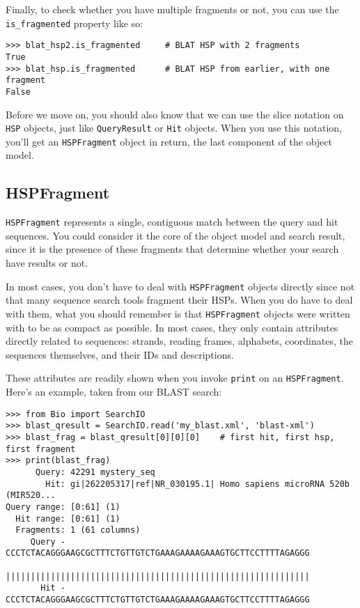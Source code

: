 \documentclass{report}
\begin{document}
Finally, to check whether you have multiple fragments or not, you can use the
\verb|is_fragmented| property like so:

\begin{verbatim}
>>> blat_hsp2.is_fragmented     # BLAT HSP with 2 fragments
True
>>> blat_hsp.is_fragmented      # BLAT HSP from earlier, with one fragment
False
\end{verbatim}

Before we move on, you should also know that we can use the slice notation on
\verb|HSP| objects, just like \verb|QueryResult| or \verb|Hit| objects. When
you use this notation, you'll get an \verb|HSPFragment| object in return, the
last component of the object model.

\subsection{HSPFragment}
\label{sec:searchio-hspfragment}

\verb|HSPFragment| represents a single, contiguous match between the query and
hit sequences. You could consider it the core of the object model and search
result, since it is the presence of these fragments that determine whether your
search have results or not.

In most cases, you don't have to deal with \verb|HSPFragment| objects directly
since not that many sequence search tools fragment their HSPs. When you do have
to deal with them, what you should remember is that \verb|HSPFragment| objects
were written with to be as compact as possible. In most cases, they only contain
attributes directly related to sequences: strands, reading frames, alphabets,
coordinates, the sequences themselves, and their IDs and descriptions.

These attributes are readily shown when you invoke \verb|print| on an
\verb|HSPFragment|. Here's an example, taken from our BLAST search:

\begin{verbatim}
>>> from Bio import SearchIO
>>> blast_qresult = SearchIO.read('my_blast.xml', 'blast-xml')
>>> blast_frag = blast_qresult[0][0][0]    # first hit, first hsp, first fragment
>>> print(blast_frag)
      Query: 42291 mystery_seq
        Hit: gi|262205317|ref|NR_030195.1| Homo sapiens microRNA 520b (MIR520...
Query range: [0:61] (1)
  Hit range: [0:61] (1)
  Fragments: 1 (61 columns)
     Query - CCCTCTACAGGGAAGCGCTTTCTGTTGTCTGAAAGAAAAGAAAGTGCTTCCTTTTAGAGGG
             |||||||||||||||||||||||||||||||||||||||||||||||||||||||||||||
       Hit - CCCTCTACAGGGAAGCGCTTTCTGTTGTCTGAAAGAAAAGAAAGTGCTTCCTTTTAGAGGG
\end{verbatim}
\end{document}
